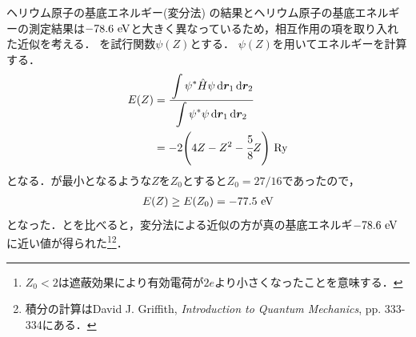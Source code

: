 \documentclass{report}
\begin{document}
  \begin{myex}{ヘリウム原子の基底エネルギー(変分法)}{}
    の結果とヘリウム原子の基底エネルギーの測定結果は$-78.6\ \r{eV}$と大きく異なっているため，相互作用の項を取り入れた近似を考える．
    を試行関数$\psi(Z)$とする．
    $\psi(Z)$を用いてエネルギーを計算する．
    \begin{align}
      E(Z) &= \cfrac{\displaystyle\int\psi^{*}\hat{H}\psi \dd{\bm{r}_1}\dd{\bm{r}_2}}{\displaystyle\int\psi^{*}\psi \dd{\bm{r}_1}\dd{\bm{r}_2}} \\
      &= -2\qty(4Z - Z^2 - \cfrac{5}{8}Z)\ \r{Ry}\label{helium-energy-function} 
    \end{align}
    となる．が最小となるような$Z$を$Z_0$とすると$Z_0 = 27/16$であったので，
    \begin{align}
      E(Z) \geq E\qty(Z_0) = -77.5\ \r{eV}\label{helium-energy-varidation-min}
    \end{align}
    となった．とを比べると，変分法による近似の方が真の基底エネルギ$-78.6\ \r{eV}$に近い値が得られた\footnote{
      $Z_0 < 2$は遮蔽効果により有効電荷が$2e$より小さくなったことを意味する．
    }\footnote{
      積分の計算はDavid J. Griffith, \textit{Introduction to Quantum Mechanics}, pp. 333-334にある．
    }．
  \end{myex}
\end{document}
